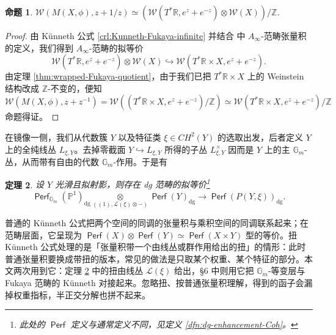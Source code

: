 \documentclass[11pt,a4paper]{article}
\DeclareMathOperator{\Perf}{\mathsf{Perf}}
\DeclareMathOperator{\dg}{\operatorname{dg}}
\theoremstyle{cnth}
\newtheorem{thm}{定理}[section]
\newtheorem{prp}[thm]{命题}
\newif\ifshowconcept
\newenvironment{conceptbox}[1]{%
    \par\medskip
    \ifshowconcept
        \begin{tcolorbox}[enhanced, breakable,
            colback=violet!3!white, colframe=violet!55!black,
            boxrule=0.5pt, arc=2pt, left=6pt, right=6pt, top=4pt, bottom=4pt,
            title={\small\textbf{概念回顾：#1}\quad{\footnotesize（译者所加）}},
            fonttitle=\bfseries, coltitle=black, colbacktitle=violet!12!white,
            toptitle=1pt, bottomtitle=1pt]
    \fi
}{%
    \ifshowconcept
        \end{tcolorbox}%
    \fi
    \par\medskip
}
\begin{document}
\begin{prp}\label{prp:Fukaya-cat-mapping-cylinder}
    $\mathcal{W} (M(X,\phi),z+1/z)\simeq\left(\mathcal{W} (T^{\ast}\mathbb{R}, e^z+e^{-z})\otimes\mathcal{W} (X)\right)/\mathbb{Z}$.
\end{prp}
\begin{proof}
    由 Künneth 公式 \ref{crl:Kunneth-Fukaya-infinite} 并结合 \cite{Ornaghi25} 中 $A_{\infty}$-范畴张量积的定义，我们得到 $A_{\infty}$-范畴的拟等价 \[
        \mathcal{W} (T^{\ast}\mathbb{R},e^z+e^{-z})\otimes\mathcal{W} (X)\hookrightarrow\mathcal{W} (T^{\ast}\mathbb{R}\times X, e^z+e^{-z}).
    \]由定理 \ref{thm:wrapped-Fukaya-quotient}，由于我们已把 $T^{\ast}\mathbb{R}\times X$ 上的 Weinstein 结构改成 $\mathbb{Z}$-不变的，便知 \[
        \mathcal{W} (M(X,\phi),z+z^{-1})=\mathcal{W}\left((T^{\ast}\mathbb{R}\times X,e^z+e^{-z})/\mathbb{Z}\right)\simeq\mathcal{W} (T^{\ast}\mathbb{R}\times X,e^z+e^{-z})/\mathbb{Z}
    \]命题得证。
\end{proof}

在镜像一侧，我们从代数簇 $Y$ 以及特征类 $\xi\in CH^2 (Y)$ 的选取出发，后者定义 $Y$ 上的全纯线丛 $L_{\xi, Y}$。去掉零截面 $Y\hookrightarrow L_{\xi, Y}$ 所得的子丛 $L_{\xi,Y}^{\times}$ 因而是 $Y$ 上的主 $\mathbb{G}_m$-丛，从而带有自由的代数 $\mathbb{G}_m$-作用。于是有

\begin{thm}\label{thm:twisted-tensor-P1-bundle}
    设 $Y$ 光滑且拟射影，则存在 dg 范畴的拟等价\footnote{此处的 $\Perf$ 定义与通常定义不同，见定义 \ref{dfn:dg-enhancement-Coh}。}
\[
\Perf_{\mathbb{G}_m}(\mathbb{P}^1)_{\dg}
\underset{((1),\mathcal{L}(\xi)\otimes-)}{\otimes}
\Perf(Y)_{\dg}
\rightarrow
\Perf(P(Y,\xi))_{\dg}.
\]
\end{thm}

\begin{conceptbox}{扭 Künneth 公式}
普通的 Künneth 公式把两个空间的同调的张量积与乘积空间的同调联系起来；在范畴层面，它呈现为 $\Perf (X)\otimes\Perf (Y)\simeq\Perf (X\times Y)$ 型的等价。扭 Künneth 公式处理的是「张量积带一个由线丛或群作用给出的扭」的情形：此时普通张量积要换成带扭的版本，常见的做法是只取某个权重、某个特征的部分。本文两次用到它：定理 \ref{thm:twisted-tensor-P1-bundle} 中的扭由线丛 $\mathcal{L} (\xi)$ 给出，§6 中则用它把 $\mathbb{G}_m$-等变层与 Fukaya 范畴的 Künneth 对接起来。忽略扭、按普通张量积理解，得到的函子会漏掉权重指标，半正交分解也拼不起来。
\par\smallskip{}
\end{conceptbox}
\end{document}
